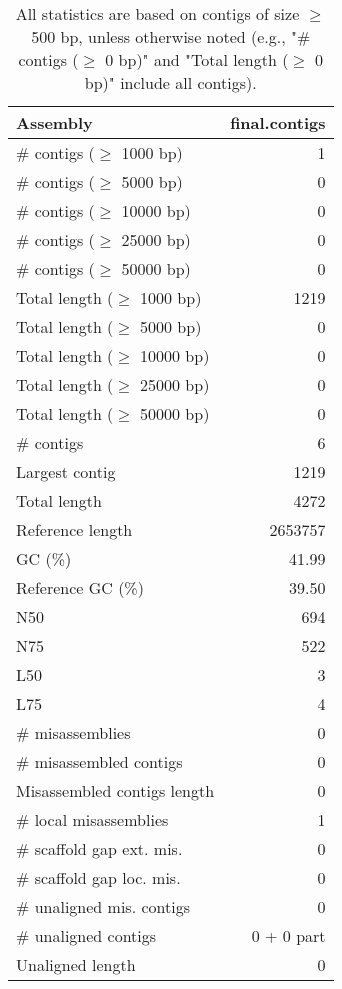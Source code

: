 \documentclass[12pt,a4paper]{article}
\begin{document}
\begin{table}[ht]
\begin{center}
\caption{All statistics are based on contigs of size $\geq$ 500 bp, unless otherwise noted (e.g., "\# contigs ($\geq$ 0 bp)" and "Total length ($\geq$ 0 bp)" include all contigs).}
\begin{tabular}{|l*{1}{|r}|}
\hline
Assembly & final.contigs \\ \hline
\# contigs ($\geq$ 1000 bp) & 1 \\ \hline
\# contigs ($\geq$ 5000 bp) & 0 \\ \hline
\# contigs ($\geq$ 10000 bp) & 0 \\ \hline
\# contigs ($\geq$ 25000 bp) & 0 \\ \hline
\# contigs ($\geq$ 50000 bp) & 0 \\ \hline
Total length ($\geq$ 1000 bp) & 1219 \\ \hline
Total length ($\geq$ 5000 bp) & 0 \\ \hline
Total length ($\geq$ 10000 bp) & 0 \\ \hline
Total length ($\geq$ 25000 bp) & 0 \\ \hline
Total length ($\geq$ 50000 bp) & 0 \\ \hline
\# contigs & 6 \\ \hline
Largest contig & 1219 \\ \hline
Total length & 4272 \\ \hline
Reference length & 2653757 \\ \hline
GC (\%) & 41.99 \\ \hline
Reference GC (\%) & 39.50 \\ \hline
N50 & 694 \\ \hline
N75 & 522 \\ \hline
L50 & 3 \\ \hline
L75 & 4 \\ \hline
\# misassemblies & 0 \\ \hline
\# misassembled contigs & 0 \\ \hline
Misassembled contigs length & 0 \\ \hline
\# local misassemblies & 1 \\ \hline
\# scaffold gap ext. mis. & 0 \\ \hline
\# scaffold gap loc. mis. & 0 \\ \hline
\# unaligned mis. contigs & 0 \\ \hline
\# unaligned contigs & 0 + 0 part \\ \hline
Unaligned length & 0 \\ \hline

\end{tabular}
\end{center}
\end{table}
\end{document}
